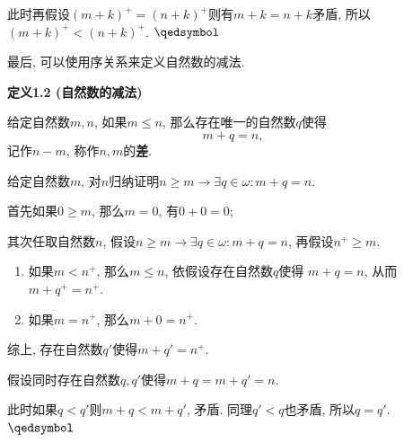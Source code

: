 \documentclass[UTF8]{ctexart}
\begin{document}
此时再假设$(m+k)^+=(n+k)^+$则有$m+k=n+k$矛盾, 所以$(m+k)^+<(n+k)^+$.
\hfill $\qedsymbol$

\vspace{10pt}

最后, 可以使用序关系来定义自然数的减法.

\vspace{10pt}

\hypertarget{sec:定义1.2}{}
\noindent\textbf{定义1.2 (自然数的减法)}

给定自然数$m,n$, 如果$m\leqslant n$, 那么存在唯一的自然数$q$使得
\[
    m+q=n,
\]
记作$n-m$, 称作$n,m$的\textbf{差}.



给定自然数$m$, 对$n$归纳证明$n\geqslant m\to\exists q\in\omega:m+q=n$.

首先如果$0\geqslant m$, 那么$m=0$, 有$0+0=0$;

其次任取自然数$n$, 假设$n\geqslant m\to\exists q\in\omega:m+q=n$,
再假设$n^+\geqslant m$.

\begin{enumerate}
    \item 如果$m<n^+$, 那么$m\leqslant n$, 依假设存在自然数$q$使得
    $m+q=n$, 从而$m+q^+=n^+$.
    \item 如果$m=n^+$, 那么$m+0=n^+$.
\end{enumerate}
综上, 存在自然数$q'$使得$m+q'=n^+$.


假设同时存在自然数$q,q'$使得$m+q=m+q'=n$.

此时如果$q<q'$则$m+q<m+q'$, 矛盾. 同理$q'<q$也矛盾, 所以$q=q'$. \hfill $\qedsymbol$
\end{document}
